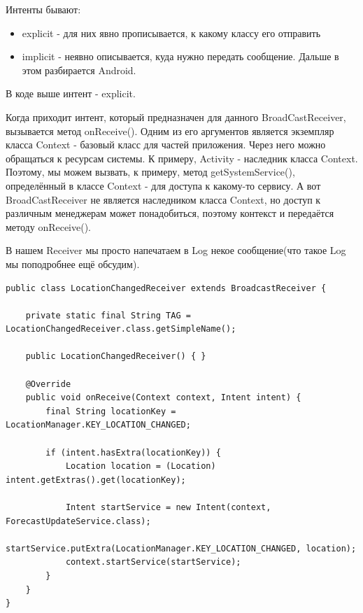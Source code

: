 \documentclass[12 pt]{article}
\begin{document}
      Интенты бывают:
      \begin{itemize}
      		\item explicit - для них явно прописывается, к какому классу его отправить
            \item implicit - неявно описывается, куда нужно передать сообщение. Дальше в этом разбирается Android.
      \end{itemize}
      В коде выше интент - explicit. 
    
    Когда приходит интент, который предназначен для данного BroadCastReceiver, вызывается метод onReceive(). Одним из его аргументов является экземпляр класса Context - базовый класс для частей приложения. Через него можно обращаться к ресурсам системы. К примеру, Activity - наследник класса Context. Поэтому, мы можем вызвать, к примеру, метод getSystemService(), определённый в классе Context - для доступа к какому-то сервису. А вот BroadCastReceiver не является наследником класса Context, но доступ к различным менеджерам может понадобиться, поэтому контекст и передаётся методу onReceive(). 
    
        В нашем Receiver мы просто напечатаем в Log некое сообщение(что такое Log мы поподробнее ещё обсудим). 
        
        \begin{lstlisting}
public class LocationChangedReceiver extends BroadcastReceiver {

    private static final String TAG = LocationChangedReceiver.class.getSimpleName();

    public LocationChangedReceiver() { }

    @Override
    public void onReceive(Context context, Intent intent) {
        final String locationKey = LocationManager.KEY_LOCATION_CHANGED;

        if (intent.hasExtra(locationKey)) {
            Location location = (Location) intent.getExtras().get(locationKey);

            Intent startService = new Intent(context, ForecastUpdateService.class);
            startService.putExtra(LocationManager.KEY_LOCATION_CHANGED, location);
            context.startService(startService);
        }
    }
}
    \end{lstlisting}
    
\end{document}
